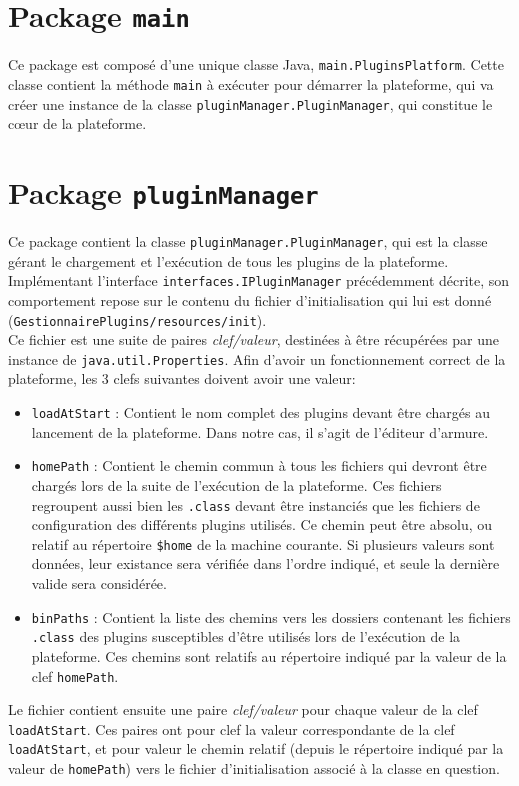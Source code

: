 \section{Package \texttt{main}}

Ce package est composé d'une unique classe Java, \texttt{main.PluginsPlatform}. Cette classe contient la méthode \texttt{main} à exécuter pour démarrer la plateforme, qui va créer une instance de la classe \texttt{pluginManager.PluginManager}, qui constitue le c\oe{}ur de la plateforme.


\section{Package \texttt{pluginManager}}

Ce package contient la classe \texttt{pluginManager.PluginManager}, qui est la classe gérant le chargement et l'exécution de tous les plugins de la plateforme. Implémentant l'interface \texttt{interfaces.IPluginManager} précédemment décrite, son comportement repose sur le contenu du fichier d'initialisation qui lui est donné (\texttt{GestionnairePlugins/resources/init}).\\

Ce fichier est une suite de paires \textit{clef/valeur}, destinées à être récupérées par une instance de \texttt{java.util.Properties}. Afin d'avoir un fonctionnement correct de la plateforme, les 3 clefs suivantes doivent avoir une valeur:\\

\begin{itemize}
	\item \texttt{loadAtStart} : Contient le nom complet des plugins devant être chargés au lancement de la plateforme. Dans notre cas, il s'agit de l'éditeur d'armure.
	\item \texttt{homePath} : Contient le chemin commun à tous les fichiers qui devront être chargés lors de la suite de l'exécution de la plateforme. Ces fichiers regroupent aussi bien les \texttt{.class} devant être instanciés que les fichiers de configuration des différents plugins utilisés. Ce chemin peut être absolu, ou relatif au répertoire \texttt{\$home} de la machine courante. Si plusieurs valeurs sont données, leur existance sera vérifiée dans l'ordre indiqué, et seule la dernière valide sera considérée.
	\item \texttt{binPaths} : Contient la liste des chemins vers les dossiers contenant les fichiers \texttt{.class} des plugins susceptibles d'être utilisés lors de l'exécution de la plateforme. Ces chemins sont relatifs au répertoire indiqué par la valeur de la clef \texttt{homePath}.\\
\end{itemize}

Le fichier contient ensuite une paire \textit{clef/valeur} pour chaque valeur de la clef \texttt{loadAtStart}. Ces paires ont pour clef la valeur correspondante de la clef \texttt{loadAtStart}, et pour valeur le chemin relatif (depuis le répertoire indiqué par la valeur de \texttt{homePath}) vers le fichier d'initialisation associé à la classe en question.
